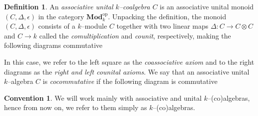 \documentclass{article}
\theoremstyle{plain}
\theoremstyle{definition}
\newtheorem{Def}[Th]{Definition}
\newtheorem{convention}[Th]{Convention}
\DeclareMathOperator{\id}{id}
\begin{document}
\begin{Def}
    An \textit{associative unital $k$--coalgebra $C$} is an associative unital monoid $(C,\Delta, \epsilon)$ in the category $\textbf{Mod}_k^\textrm{op}$. Unpacking the definition, the monoid $(C,\Delta,\epsilon)$ consists of a $k$--module $C$ together with two linear maps $\Delta\colon C\to C\otimes C$ and $C\to k$ called the \textit{comultiplication} and \textit{counit}, respectively, making the following diagrams commutative 
    
        \begin{center}
    \end{center}
    In this case, we refer to the left square as  the  \textit{coassociative axiom}  and to the right diagrams as the  \textit{right and left counital axioms}. We say that an associative unital $k$--algebra $C$ is \textit{cocommutative} if the following diagram is commutative 
    \begin{center}
    \end{center}
\end{Def}

\begin{convention}
We will work mainly with associative and unital $k$--(co)algebras, hence from now on, we refer to them simply as $k$--(co)algebras.     
\end{convention}
\end{document}
